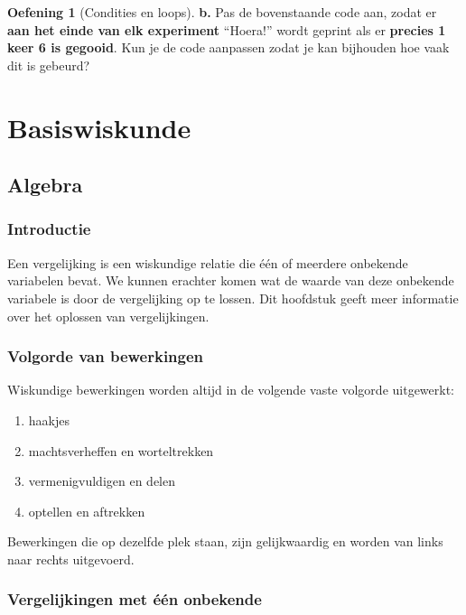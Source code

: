 \documentclass[
  a4paper,
]{scrbook}
\theoremstyle{definition}
\newtheorem{exercise}{Oefening}[chapter]
\theoremstyle{remark}
\begin{document}
\begin{exercise}[Condities en
loops]
\textbf{b.} Pas de bovenstaande code aan, zodat er \textbf{aan het einde
van elk experiment} ``Hoera!'' wordt geprint als er \textbf{precies 1
keer 6 is gegooid}. Kun je de code aanpassen zodat je kan bijhouden hoe
vaak dit is gebeurd?

\end{exercise}

\part{Basiswiskunde}

\hypertarget{sec-algebra}{%
\chapter{Algebra}\label{sec-algebra}}

\hypertarget{introductie}{%
\section{Introductie}\label{introductie}}

Een vergelijking is een wiskundige relatie die één of meerdere onbekende
variabelen bevat. We kunnen erachter komen wat de waarde van deze
onbekende variabele is door de vergelijking op te lossen. Dit hoofdstuk
geeft meer informatie over het oplossen van vergelijkingen.

\hypertarget{volgorde-van-bewerkingen}{%
\section{Volgorde van bewerkingen}\label{volgorde-van-bewerkingen}}

Wiskundige bewerkingen worden altijd in de volgende vaste volgorde
uitgewerkt:

\begin{enumerate}
\def\labelenumi{\arabic{enumi}.}
\item
  haakjes
\item
  machtsverheffen en worteltrekken
\item
  vermenigvuldigen en delen
\item
  optellen en aftrekken
\end{enumerate}

Bewerkingen die op dezelfde plek staan, zijn gelijkwaardig en worden van
links naar rechts uitgevoerd.

\hypertarget{vergelijkingen-met-uxe9uxe9n-onbekende}{%
\section{Vergelijkingen met één
onbekende}\label{vergelijkingen-met-uxe9uxe9n-onbekende}}
\end{document}
